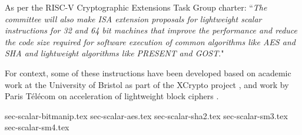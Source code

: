 
As per the RISC-V Cryptographic Extensions Task Group charter:
``{\em The committee will also make ISA extension proposals for lightweight
scalar instructions for 32 and 64 bit machines that improve the performance
and reduce the code size required for software execution of common algorithms
like AES and SHA and lightweight algorithms like PRESENT and GOST}."

\bigskip

For context, some of these instructions have been developed based on academic
work at the University of Bristol as part of the XCrypto project
\cite{MPP:19},
and work by
Paris T\'{e}l\'{e}com on acceleration of lightweight block ciphers
\cite{TGMGD:19}.



{sec-scalar-bitmanip.tex}
{sec-scalar-aes.tex}
\clearpage
{sec-scalar-sha2.tex}
{sec-scalar-sm3.tex}
{sec-scalar-sm4.tex}


